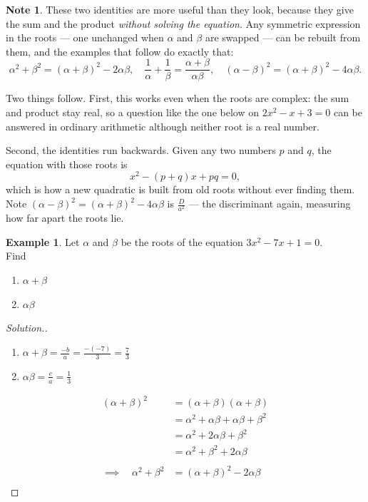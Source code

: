 \documentclass[11pt,a4paper]{article}
\theoremstyle{definition}
\newtheorem{example}[thm]{Example}
\newtheorem{note}[thm]{Note}
\newenvironment{solution}
  {\renewcommand{\qedsymbol}{}\begin{proof}[\textit{Solution}.]}
  {\end{proof}}
\begin{document}
\begin{note}
These two identities are more useful than they look, because they give the sum and
the product \emph{without solving the equation}. Any symmetric expression in the
roots --- one unchanged when $\alpha$ and $\beta$ are swapped --- can be rebuilt from
them, and the examples that follow do exactly that:
$$\alpha^{2}+\beta^{2}=(\alpha+\beta)^{2}-2\alpha\beta,\quad 
\frac{1}{\alpha}+\frac{1}{\beta}=\frac{\alpha+\beta}{\alpha\beta},\quad 
(\alpha-\beta)^{2}=(\alpha+\beta)^{2}-4\alpha\beta .$$

Two things follow. First, this works even when the roots are complex: the sum and
product stay real, so a question like the one below on $2x^{2}-x+3=0$ can be
answered in ordinary arithmetic although neither root is a real number.

Second, the identities run backwards. Given any two numbers $p$ and $q$, the
equation with those roots is
$$x^{2}-(p+q)x+pq=0,$$
which is how a new quadratic is built from old roots without ever finding them.
Note $(\alpha-\beta)^{2}=(\alpha+\beta)^{2}-4\alpha\beta$ is $\frac{D}{a^{2}}$ ---
the discriminant again, measuring how far apart the roots lie.
\end{note}
\begin{example}

Let $\alpha$ and $\beta$ be the roots of the equation $3x^2-7x+1=0$.\\
Find
\begin{enumerate}
\item $\alpha +\beta$
\item $\alpha \beta$\\
\end{enumerate}
\end{example}
\begin{solution}

\begin{enumerate}
\item $\alpha +\beta = \frac{-b}{a}=\frac{-(-7)}{3}=\frac{7}{3}$\\

\item $\alpha \beta = \frac{c}{a}=\frac{1}{3}$\\
\end{enumerate}



\begin{align*}
(\alpha + \beta )^2 &= (\alpha +\beta)(\alpha +\beta)\\
                    &= \alpha^2+\alpha \beta + \alpha \beta +\beta^2\\
                    & = \alpha^2+2\alpha \beta + \beta^2\\
                    &= \alpha^2+\beta^2+2\alpha \beta\\\\
\implies \quad  \alpha^2+\beta^2 & = (\alpha +\beta)^2-2\alpha \beta\\
\end{align*}
\end{solution}
\end{document}
